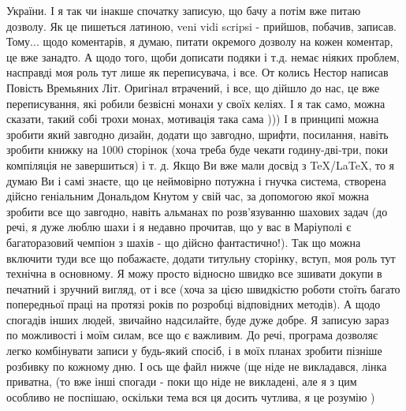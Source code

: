 України. І я так чи інакше спочатку записую, що бачу а потім вже питаю дозволу.
Як це пишеться латиною, veni vidi scripsi - прийшов, побачив, записав. Тому...
щодо коментарів, я думаю, питати окремого дозволу на кожен коментар, це вже
занадто. А щодо того, щоби дописати подяки і т.д. немає ніяких проблем,
насправді моя роль тут лише як переписувача, і все. От колись Нестор написав
Повість Времьяних Літ.  Оригінал втрачений, і все, що дійшло до нас, це вже
переписування, які робили безвісні монахи у своїх келіях. І я так само, можна
сказати, такий собі трохи монах, мотивація така сама )))  І в принципі можна
зробити який завгодно дизайн, додати що завгодно, шрифти, посилання, навіть
зробити книжку на 1000 сторінок (хоча треба буде чекати годину-дві-три, поки
компіляція не завершиться) і т. д.  Якщо Ви вже мали досвід з TeX/LaTeX, то я
думаю Ви і самі знаєте, що це неймовірно потужна і гнучка система, створена
дійсно геніальним Дональдом Кнутом у свій час, за допомогою якої можна зробити
все що завгодно, навіть альманах по розв'язуванню шахових задач (до речі, я дуже люблю шахи 
і я недавно прочитав, що у вас в Маріуполі є багаторазовий чемпіон з шахів - що
дійсно фантастично!).  Так що можна включити туди все що побажаєте, додати
титульну сторінку, вступ, моя роль тут технічна в основному. Я можу просто
відносно швидко все зшивати докупи в печатний і зручний вигляд, от і все (хоча
за цією швидкістю роботи стоїть багато попередньої праці на протязі років по
розробці відповідних методів). А щодо спогадів інших людей, звичайно
надсилайте, буде дуже добре. Я записую зараз по можливості і моїм силам, все що
є важливим. До речі, програма дозволяє легко комбінувати записи у будь-який
спосіб, і в моїх планах зробити пізніше розбивку по кожному дню. І ось ще файл
нижче (ще ніде не викладався, лінка приватна, (то вже інші спогади - поки що
ніде не викладені, але я з цим особливо не поспішаю, оскільки тема вся ця
досить чутлива, я це розумію )
